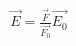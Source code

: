 \documentclass[preview]{standalone}
\begin{document}
\begin{align*}
\vec{E} = \frac{\vec{F}}{\vec{F_0}} \vec{E_0}
\end{align*}
\end{document}
